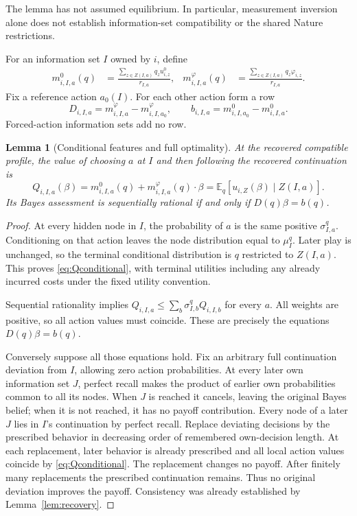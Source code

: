 \documentclass[11pt,a4paper]{article}
\numberwithin{equation}{section}
\newtheorem{lemma}[theorem]{Lemma}
\theoremstyle{definition}
\newcommand{\E}{\mathbb E}
\begin{document}
The lemma has not assumed equilibrium. In particular, measurement
inversion alone does not establish information-set compatibility or
the shared Nature restrictions.

For an information set \(I\) owned by \(i\), define
\begin{align}
 m^0_{i,I,a}(q)&=
     \frac{\sum_{z\in Z(I,a)}q_zu^0_{i,z}}{r_{I,a}},&
 m^\varphi_{i,I,a}(q)&=
     \frac{\sum_{z\in Z(I,a)}q_z\varphi_{i,z}}{r_{I,a}}.
 \label{eq:conditionalfeatures}
\end{align}
Fix a reference action \(a_0(I)\). For each other action form a row
\begin{equation}\label{eq:Dandb}
 D_{i,I,a}=m^\varphi_{i,I,a}-m^\varphi_{i,I,a_0},\qquad
 b_{i,I,a}=m^0_{i,I,a_0}-m^0_{i,I,a}.
\end{equation}
Forced-action information sets add no row.

\begin{lemma}[Conditional features and full optimality]\label{lem:indifference}
At the recovered compatible profile, the value of choosing \(a\) at
\(I\) and then following the recovered continuation is
\begin{equation}\label{eq:Qconditional}
 Q_{i,I,a}(\beta)
    =m^0_{i,I,a}(q)+m^\varphi_{i,I,a}(q)\cdot\beta
    =\E_q[u_{i,Z}(\beta)\mid Z(I,a)].
\end{equation}
Its Bayes assessment is sequentially rational if and only if
\(D(q)\beta=b(q)\).
\end{lemma}
\begin{proof}
At every hidden node in \(I\), the probability of \(a\) is the same
positive \(\sigma^q_{I,a}\). Conditioning on that action leaves the
node distribution equal to \(\mu^q_I\). Later play is unchanged, so
the terminal conditional distribution is \(q\) restricted to \(Z(I,a)\).
This proves \eqref{eq:Qconditional}, with terminal utilities including
any already incurred costs under the fixed utility convention.

Sequential rationality implies
\(Q_{i,I,a}\le\sum_b\sigma^q_{I,b}Q_{i,I,b}\) for every \(a\).
All weights are positive, so all action values must coincide.
These are precisely the equations \(D(q)\beta=b(q)\).

Conversely suppose all those equations hold. Fix an arbitrary full
continuation deviation from \(I\), allowing zero action probabilities.
At every later own information set \(J\), perfect recall makes the
product of earlier own probabilities common to all its nodes.
When \(J\) is reached it cancels, leaving the original Bayes belief;
when it is not reached, it has no payoff contribution. Every node
of a later \(J\) lies in \(I\)'s continuation by perfect recall.
Replace deviating decisions by the prescribed behavior in decreasing
order of remembered own-decision length. At each replacement, later
behavior is already prescribed and all local action values coincide
by \eqref{eq:Qconditional}. The replacement changes no payoff.
After finitely many replacements the prescribed continuation remains.
Thus no original deviation improves the payoff. Consistency was
already established by Lemma~\ref{lem:recovery}.
\end{proof}
\end{document}
